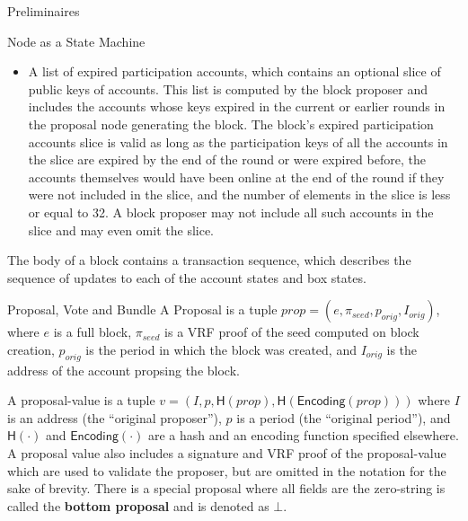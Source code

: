 \documentclass[10pt,a4paper]{article}
\begin{document}
\begin{section}{Preliminaires}
\begin{subsection}{Node as a State Machine}
\begin{itemize}
    \item
    A list of expired participation accounts, which contains an optional slice
    of public keys of accounts. 
    This list is computed by the block proposer and includes the accounts whose 
    keys expired in the current or earlier rounds in the proposal node generating the block.
    The block's expired participation accounts slice is valid as long as the participation keys 
    of all the accounts in the slice are expired by the end of the round or
    were expired before, the accounts themselves would have been online at the end
    of the round if they were not included in the slice, and the number of elements
    in the slice is less or equal to 32. 
    A block proposer may not include all such accounts in the slice and may even omit
    the slice.
\end{itemize}

The body of a block contains a transaction sequence, which describes the sequence
of updates to each of the account states and box states. 
%


\end{subsection}
\begin{subsection}{Proposal, Vote and Bundle}\label{sect:proposal-vote-bundle}
A Proposal is a tuple $prop = (e, \pi_{seed}, p_{orig}, I_{orig})$, where
$e$ is a full block, $\pi_{seed}$ is a VRF proof of the seed computed
on block creation, $p_{orig}$ is the period in which the block was created,
and $I_{orig}$ is the address of the account propsing the block.

A proposal-value is a tuple $v = (I, p, \mathsf{H}(prop), \mathsf{H}(\mathsf{Encoding}(prop)))$ where 
$I$ is an address (the ``original proposer''), 
$p$ is a period (the ``original period''), 
and 
$\mathsf{H}(\cdot)$ and $\mathsf{Encoding}(\cdot)$ are a hash and an encoding 
function specified elsewhere. 
A proposal value also includes a signature and VRF proof of the proposal-value 
  which are used to validate the proposer, but are omitted in the notation for
  the sake of brevity.
There is a special proposal where all fields are the zero-string is called the {\bf bottom 
proposal} and is denoted as $\bot$.


\end{subsection}
\end{section}
\end{document}
